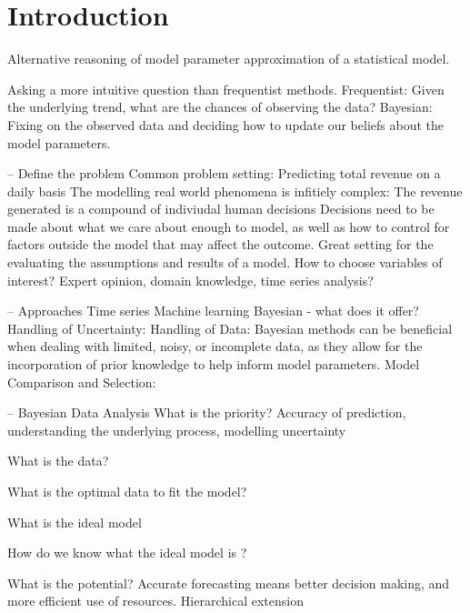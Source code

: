 \section{Introduction}

Alternative reasoning of model parameter approximation of a statistical model.

Asking a more intuitive question than frequentist methods.
Frequentist: Given the underlying trend, what are the chances of observing the data?
Bayesian: Fixing on the observed data and deciding how to update our beliefs about the model parameters.

-- Define the problem
Common problem setting: Predicting total revenue on a daily basis The modelling
real world phenomena is infitiely complex: The revenue generated is a compound
of indiviudal human decisions Decisions need to be made about what we care
about enough to model, as well as how to control for factors outside the model
that may affect the outcome. Great setting for the evaluating the assumptions
and results of a model.
How to choose variables of interest?
Expert opinion, domain knowledge, time series analysis?

-- Approaches
Time series
Machine learning
Bayesian - what does it offer?
  Handling of Uncertainty: 
  Handling of Data: Bayesian methods can be beneficial
  when dealing with limited, noisy, or incomplete data, as they allow for the
  incorporation of prior knowledge to help inform model parameters. 
  Model Comparison and Selection:

-- Bayesian Data Analysis
What is the priority? 
Accuracy of prediction, understanding the underlying process, modelling uncertainty

What is the data? 

What is the optimal data to fit the model?

What is the ideal model 

How do we know what the ideal model is ?

What is the potential?
Accurate forecasting means better decision making, and more efficient use of resources.
Hierarchical extension 



